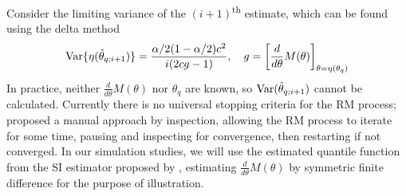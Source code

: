 Consider the limiting variance of the $(i+1)$\textsuperscript{th} estimate, which can be found using the delta method \cite{Garthwaite1992}
\[
    \mathrm{Var}\{\eta(\hat\theta_{q; i+1})\} = \frac{\alpha/2 (1-\alpha/2) c^2}{i(2cg-1)}, \quad g = \left[ \frac{d}{d\theta}M(\theta) \right]_{\theta = \eta(\theta_q)}
\] 
In practice, neither $\frac{d}{d\theta}M(\theta)$ nor $\theta_q$ are known, so $\mathrm{Var}(\hat\theta_{q; i+1})$ cannot be calculated. Currently there is no universal stopping criteria for the RM process; \citet{Garthwaite1992} proposed a manual approach by inspection, allowing the RM process to iterate for some time, pausing and inspecting for convergence, then restarting if not converged. In our simulation studies, we will use the estimated quantile function from the SI estimator proposed by \citet{Huang2019}, estimating $\frac{d}{d\theta}M(\theta)$ by symmetric finite difference \cite{Fu2015} for the purpose of illustration.